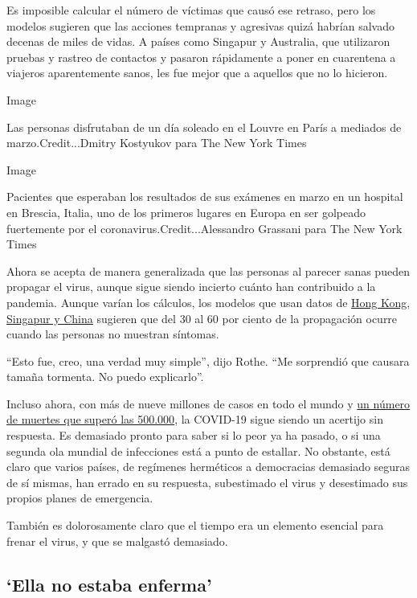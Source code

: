 Es imposible calcular el número de víctimas que causó ese retraso, pero
los modelos sugieren que las acciones tempranas y agresivas quizá
habrían salvado decenas de miles de vidas. A países como Singapur y
Australia, que utilizaron pruebas y rastreo de contactos y pasaron
rápidamente a poner en cuarentena a viajeros aparentemente sanos, les
fue mejor que a aquellos que no lo hicieron.

Image

Las personas disfrutaban de un día soleado en el Louvre en París a
mediados de marzo.Credit...Dmitry Kostyukov para The New York Times

Image

Pacientes que esperaban los resultados de sus exámenes en marzo en un
hospital en Brescia, Italia, uno de los primeros lugares en Europa en
ser golpeado fuertemente por el coronavirus.Credit...Alessandro Grassani
para The New York Times

Ahora se acepta de manera generalizada que las personas al parecer sanas
pueden propagar el virus, aunque sigue siendo incierto cuánto han
contribuido a la pandemia. Aunque varían los cálculos, los modelos que
usan datos de
\href{https://www.nature.com/articles/s41591-020-0869-5}{Hong Kong},
\href{https://www.eurosurveillance.org/content/10.2807/1560-7917.ES.2020.25.17.2000257}{Singapur
y China} sugieren que del 30 al 60 por ciento de la propagación ocurre
cuando las personas no muestran síntomas.

``Esto fue, creo, una verdad muy simple'', dijo Rothe. ``Me sorprendió
que causara tamaña tormenta. No puedo explicarlo''.

Incluso ahora, con más de nueve millones de casos en todo el mundo y
\href{https://www.nytimes3xbfgragh.onion/interactive/2020/world/coronavirus-maps.html}{un
número de muertes que superó las 500.000}, la COVID-19 sigue siendo un
acertijo sin respuesta. Es demasiado pronto para saber si lo peor ya ha
pasado, o si una segunda ola mundial de infecciones está a punto de
estallar. No obstante, está claro que varios países, de regímenes
herméticos a democracias demasiado seguras de sí mismas, han errado en
su respuesta, subestimado el virus y desestimado sus propios planes de
emergencia.

También es dolorosamente claro que el tiempo era un elemento esencial
para frenar el virus, y que se malgastó demasiado.

\hypertarget{ella-no-estaba-enferma}{%
\subsection{`Ella no estaba enferma'}\label{ella-no-estaba-enferma}}

